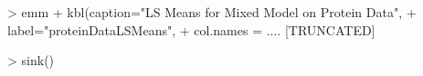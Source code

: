 
> emm %
+   kbl(caption="LS Means for Mixed Model on Protein Data",
+       label="proteinDataLSMeans",
+       col.names = .... [TRUNCATED] 

> sink()
